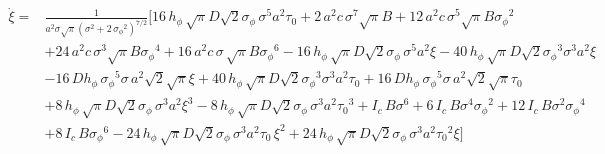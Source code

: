 \begin{landscape}
\clearpage
\begin{align}\dot{\xi}=&\frac{1}{{a}^{2}{\sigma}{\sqrt{\pi}}\left({\sigma}^{2}+2\,{{\sigma_{\phi}}}^{2}\right)^{7/2}}\Bigg[16\,{h_{\phi}}\,\sqrt{\pi}D\sqrt{2}{\sigma_{\phi}}\,{\sigma}^{5}{a}^{2}{\tau_0}+2\,{a}^{2}c\,{\sigma}^{7}\sqrt{\pi}B+12\,{a}^{2}c\,{\sigma}^{5}\sqrt{\pi}B{{\sigma_{\phi}}}^{2}\nonumber\\&+24\,{a}^{2}c\,{\sigma}^{3}\sqrt{\pi}B{{\sigma_{\phi}}}^{4}+16\,{a}^{2}c\,\sigma\,\sqrt{\pi}B{{\sigma_{\phi}}}^{6}-16\,{h_{\phi}}\,\sqrt{\pi}D\sqrt{2}{\sigma_{\phi}}\,{\sigma}^{5}{a}^{2}{\xi}-40\,{h_{\phi}}\,\sqrt{\pi}D\sqrt{2}{{\sigma_{\phi}}}^{3}{\sigma}^{3}{a}^{2}{\xi}\nonumber\\&-16\,D{h_{\phi}}\,{{\sigma_{\phi}}}^{5}\sigma\,{a}^{2}\sqrt{2}\sqrt{\pi}{\xi}+40\,{h_{\phi}}\,\sqrt{\pi}D\sqrt{2}{{\sigma_{\phi}}}^{3}{\sigma}^{3}{a}^{2}{\tau_0}+16\,D{h_{\phi}}\,{{\sigma_{\phi}}}^{5}\sigma\,{a}^{2}\sqrt{2}\sqrt{\pi}{\tau_0}\nonumber\\&+8\,{h_{\phi}}\,\sqrt{\pi}D\sqrt{2}{\sigma_{\phi}}\,{\sigma}^{3}{a}^{2}{{\xi}}^{3}-8\,{h_{\phi}}\,\sqrt{\pi}D\sqrt{2}{\sigma_{\phi}}\,{\sigma}^{3}{a}^{2}{{\tau_0}}^{3}+{I_{c}}\,B{\sigma}^{6}+6\,{I_{c}}\,B{\sigma}^{4}{{\sigma_{\phi}}}^{2}+12\,{I_{c}}\,B{\sigma}^{2}{{\sigma_{\phi}}}^{4}\nonumber\\&+8\,{I_{c}}\,B{{\sigma_{\phi}}}^{6}-24\,{h_{\phi}}\,\sqrt{\pi}D\sqrt{2}{\sigma_{\phi}}\,{\sigma}^{3}{a}^{2}{\tau_0}\,{{\xi}}^{2}+24\,{h_{\phi}}\,\sqrt{\pi}D\sqrt{2}{\sigma_{\phi}}\,{\sigma}^{3}{a}^{2}{{\tau_0}}^{2}{\xi}\Bigg]
\end{align}
\end{landscape}